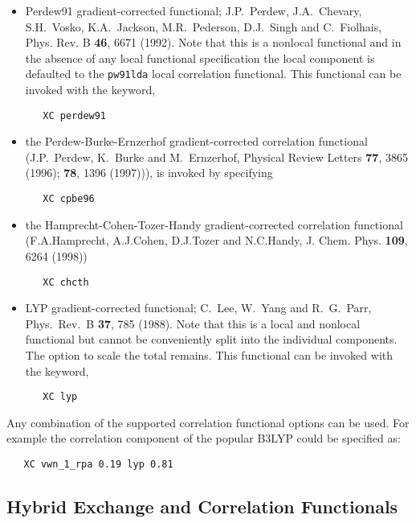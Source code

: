 \begin{itemize}
\item Perdew91 gradient-corrected functional;  J.P.~Perdew,
  J.A.~Chevary, S.H.~Vosko, K.A.~Jackson, M.R.~Pederson, D.J.~Singh
  and C.~Fiolhais, Phys. Rev. B {\bf 46}, 6671 (1992). Note that this
  is a nonlocal functional and in the absence of any local functional 
  specification the local component is defaulted to the \verb+pw91lda+ local 
  correlation functional.  This functional can be invoked with the keyword,
\begin{verbatim}
   XC perdew91
\end{verbatim}

\item the Perdew-Burke-Ernzerhof gradient-corrected correlation functional \\
 (J.P.~Perdew, K.~Burke and M.~Ernzerhof, Physical Review Letters
{\bf 77}, 3865 (1996); {\bf 78}, 1396 (1997))), is invoked by specifying

\begin{verbatim}
   XC cpbe96
\end{verbatim}

\item the Hamprecht-Cohen-Tozer-Handy  gradient-corrected correlation 
functional
(F.A.Hamprecht, A.J.Cohen, D.J.Tozer and N.C.Handy, 
    J. Chem. Phys. {\bf 109}, 6264 (1998))
\begin{verbatim}
   XC chcth
\end{verbatim}

\item LYP gradient-corrected functional; C.~Lee, W.~Yang and
   R.~G.~Parr, Phys.~Rev.~B {\bf 37}, 785 (1988).  Note that this
  is a local and nonlocal functional but cannot be conveniently split
  into the individual components.  The option to scale the total remains.
  This functional can be invoked with the keyword,
\begin{verbatim}
   XC lyp
\end{verbatim}

\end{itemize}

\fussy

Any combination of the supported correlation functional options can be
used.  For example the correlation component of the popular B3LYP
could be specified as:
\begin{verbatim}
   XC vwn_1_rpa 0.19 lyp 0.81
\end{verbatim}

  
\subsection{Hybrid Exchange and Correlation Functionals}

